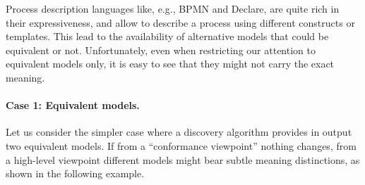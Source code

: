 Process description languages like, e.g., BPMN and Declare, are quite rich in their expressiveness, and allow to describe a process using different constructs or templates. This lead to the availability of alternative models that could be equivalent or not. Unfortunately, even when restricting our attention to equivalent models only, it is easy to see that they might not carry the exact meaning.


\paragraph{Case 1: Equivalent models.} Let us consider the simpler case where a discovery algorithm provides in output two equivalent models. If from a ``conformance viewpoint'' nothing changes, from a high-level viewpoint different models might bear subtle meaning distinctions, as shown in the following example.

